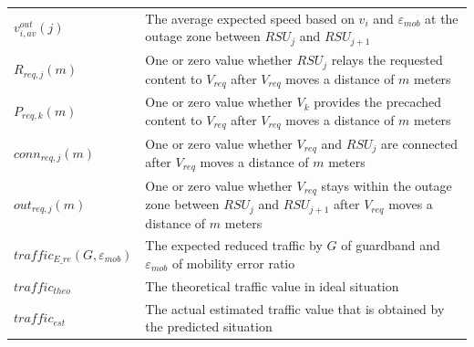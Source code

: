 \documentclass[electronics,aricle,accept,pdftex,moreauthors]{Definitions/mdpi}
\begin{document}
\begin{table}[H]
{\begin{tabularx}{\textwidth}{>{\centering\arraybackslash}m{\cellWidtha}>{\raggedright
\arraybackslash}m{\cellWidthb}}
  $v^{out}_{i, av}(j)$ & The average expected speed based on $v_{i}$ and $\varepsilon_{mob}$ at the outage zone between $RSU_{j}$ and $RSU_{j+1}$ \\
        $R_{req, j}(m)$ & One or zero value whether $RSU_{j}$ relays the requested content to $V_{req}$ after $V_{req}$ moves a distance of $m$ meters \\
        $P_{req, k}(m)$ & One or zero value whether $V_{k}$ provides the precached content to $V_{req}$ after $V_{req}$ moves a distance of $m$ meters \\
        $conn_{req, j}(m)$ & One or zero value whether $V_{req}$ and $RSU_{j}$ are connected after $V_{req}$ moves a distance of $m$ meters \\
        $out_{req, j}(m)$ & One or zero value whether $V_{req}$ stays within the outage zone between $RSU_{j}$ and $RSU_{j+1}$ after $V_{req}$ moves a distance of $m$ meters \\
        $traffic_{E\_re}(G, \varepsilon_{mob})$ & The expected reduced traffic by $G$ of guardband and $\varepsilon_{mob}$ of mobility error ratio \\
        $traffic_{theo}$ & The theoretical traffic value in ideal situation \\
        $traffic_{est}$ & The actual estimated traffic value that is obtained by the predicted situation \\

     \bottomrule
\end{tabularx}}

    \label{tab.2}
\end{table}
\end{document}
